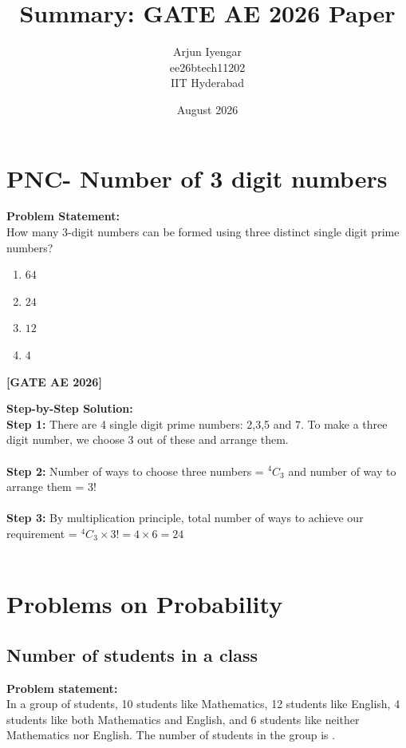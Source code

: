 \documentclass[journal,12pt,onecolumn]{IEEEtran}
\title{Summary: GATE AE 2026 Paper}
\author{Arjun Iyengar \\ ee26btech11202 \\ IIT Hyderabad}
\date{August 2026}
\theoremstyle{remark}
\begin{document}
\maketitle

\section{PNC- Number of 3 digit numbers}

\noindent \textbf{Problem Statement:} \\ How many 3-digit numbers can be formed using three distinct single digit prime numbers?

\begin{enumerate}
    \item $64$
    \item $24$
    \item $12$
    \item $4$
\end{enumerate} 
\hfill \textbf{[GATE AE 2026]}

\noindent \textbf{Step-by-Step Solution:}
\\
\noindent \textbf{Step 1:} There are 4 single digit prime numbers: 2,3,5 and 7. To make a three digit number, we choose 3 out of these and arrange them.\\ \\
  \textbf{Step 2:} Number of ways to choose three numbers = ${}^4C_3$ and number of way to arrange them = 3!\\ \\
  \textbf{Step 3:} By multiplication principle, total number of ways to achieve our requirement = ${}^4C_3 \times 3! = 4 \times 6 = 24$\\ \\


\newpage

\section{Problems on Probability}
\subsection{Number of students in a class}

\noindent \textbf{Problem statement:}\\ In a group of students, 10 students like Mathematics, 12 students like English, 4 students like both Mathematics and English, and 6 students like neither Mathematics nor English. The number of students in the group is \underline{\hspace{1cm}}.
\end{document}
